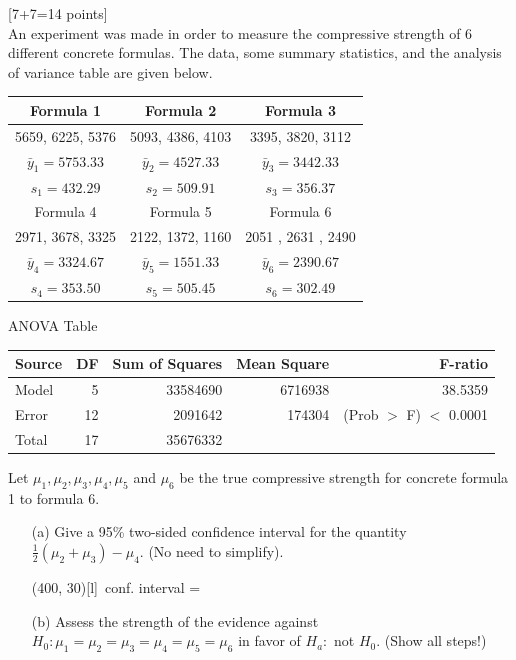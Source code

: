\documentclass[11pt]{article}
\begin{document}
{\hfill[7+7=14 points] \\
%
An experiment was made in order to measure the compressive strength of 6 different concrete formulas. The data, some summary statistics, and the
analysis of variance table are given below.
%
\begin{center}
\begin{tabular}{|c|c|c|}
\hline
Formula 1  & Formula 2 & Formula 3 \\
\hline
5659, 6225, 5376 & 5093, 4386, 4103 & 3395, 3820, 3112 \\
$\bar{y}_1 = 5753.33$ & $\bar{y}_2 = 4527.33$& $\bar{y}_3 = 3442.33$\\
$s_1 = 432.29$ & $s_2 = 509.91$ & $s_3 = 356.37$\\
\hline
 Formula 4 & Formula 5 & Formula 6\\ \hline
2971, 3678, 3325 & 2122, 1372, 1160 & 2051 , 2631 , 2490  \\
$\bar{y}_4 = 3324.67$ & $\bar{y}_5 = 1551.33$ & $\bar{y}_6 = 2390.67$\\
$s_4 = 353.50$ & $s_5 = 505.45$ & $s_6 = 302.49$ \\ \hline

\end{tabular}
\vskip 1cm ANOVA Table\\
\vskip 0.2cm
\begin{tabular}{|l|r|r|r|r|}
\hline
Source & DF & Sum of Squares & Mean Square & F-ratio\\
\hline
Model  & 5 & 33584690 & 6716938 & 38.5359 \\
Error   & 12  & 2091642  & 174304  & (Prob $>$ F) $<$ 0.0001\\
\hline
Total    & 17 & 35676332 & &    \\
\hline
\end{tabular}
\end{center}

Let $\mu_1, \mu_2, \mu_3, \mu_4, \mu_5$ and $\mu_6$ be the true compressive strength
for concrete formula 1 to formula 6.

\begin{enumerate}
%
\item[(a)] Give a 95\% two-sided confidence interval
for the quantity $\frac{1}{2}(\mu_2 + \mu_3) - \mu_4$. (No need to
simplify).

 \hfill \framebox(400, 30)[l]{\, conf. interval = }
\vskip 8cm



\newpage
\item[(b)] Assess the strength of the evidence
against $H_0: \mu_1=\mu_2=\mu_3=\mu_4 = \mu_5 = \mu_6$ in favor of $H_a:$ not $H_0$.
(Show all steps!)


\end{enumerate}}
\end{document}
